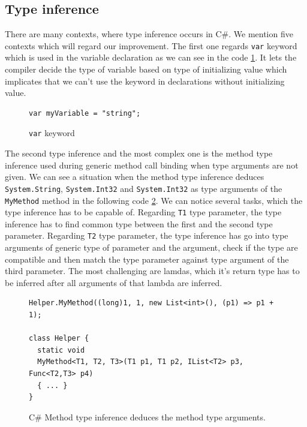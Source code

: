 \subsection{Type inference}

There are many contexts, where type inference occurs in C\#.
We mention five contexts which will regard our improvement.
The first one regards \texttt{var} keyword which is used in the variable declaration as we can see in the code \ref{img09:var}.
It lets the compiler decide the type of variable based on type of initializing value which implicates that we can't use the keyword in declarations without initializing value.
\par
\begin{figure}
\begin{lstlisting}[style=csharp]
var myVariable = "string";
\end{lstlisting}
\caption{\texttt{var} keyword}
\label{img09:var}
\end{figure}
\par
The second type inference and the most complex one is the method type inference used during generic method call binding when type arguments are not given.
We can see a situation when the method type inference deduces \texttt{System.String}, \texttt{System.Int32} and \texttt{System.Int32} as type arguments of the \texttt{MyMethod} method in the following code \ref{img06:typeInference}.
We can notice several tasks, which the type inference has to be capable of.
Regarding \texttt{T1} type parameter, the type inference has to find common type between  the first and the second type parameter.
Regarding \texttt{T2} type parameter, the type inference has go into type arguments of generic type of parameter and the argument, check if the type are compatible and then match the type parameter against type argument of the third parameter.
The most challenging are lamdas, which it's return type has to be inferred after all arguments of that lambda are inferred. 
\par
\begin{figure}
\begin{lstlisting}[style=csharp]
Helper.MyMethod((long)1, 1, new List<int>(), (p1) => p1 + 1);

class Helper {
  static void 
  MyMethod<T1, T2, T3>(T1 p1, T1 p2, IList<T2> p3, Func<T2,T3> p4) 
  { ... }
}
\end{lstlisting}
\caption{C\# Method type inference deduces the method type arguments.}
\label{img06:typeInference}
\end{figure}

